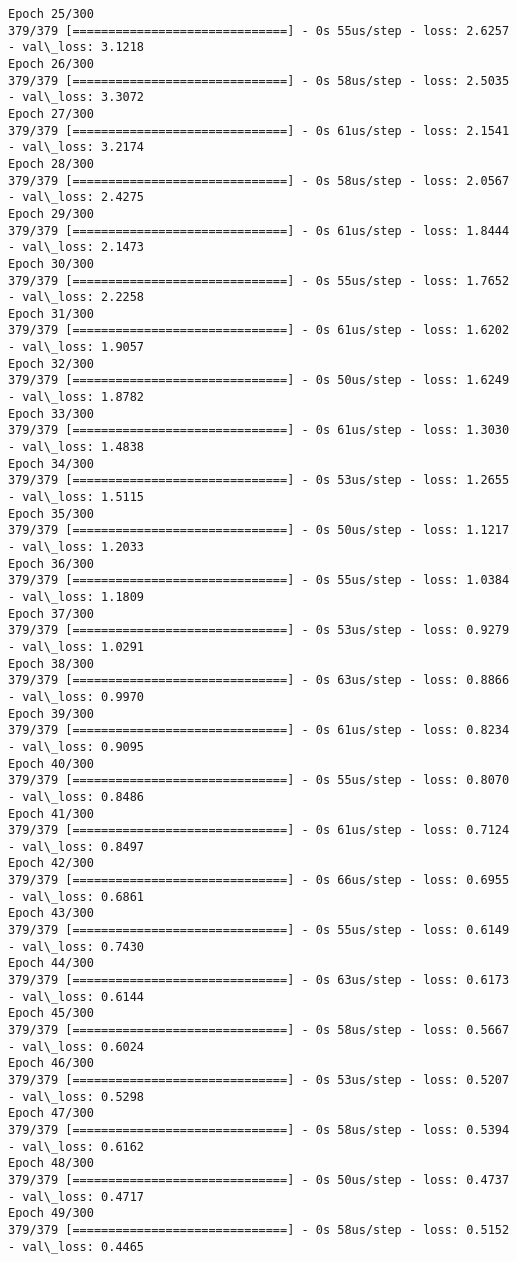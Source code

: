 \documentclass[11pt]{article}
\begin{document}
\begin{Verbatim}[commandchars=\\\{\}]
Epoch 25/300
379/379 [==============================] - 0s 55us/step - loss: 2.6257 - val\_loss: 3.1218
Epoch 26/300
379/379 [==============================] - 0s 58us/step - loss: 2.5035 - val\_loss: 3.3072
Epoch 27/300
379/379 [==============================] - 0s 61us/step - loss: 2.1541 - val\_loss: 3.2174
Epoch 28/300
379/379 [==============================] - 0s 58us/step - loss: 2.0567 - val\_loss: 2.4275
Epoch 29/300
379/379 [==============================] - 0s 61us/step - loss: 1.8444 - val\_loss: 2.1473
Epoch 30/300
379/379 [==============================] - 0s 55us/step - loss: 1.7652 - val\_loss: 2.2258
Epoch 31/300
379/379 [==============================] - 0s 61us/step - loss: 1.6202 - val\_loss: 1.9057
Epoch 32/300
379/379 [==============================] - 0s 50us/step - loss: 1.6249 - val\_loss: 1.8782
Epoch 33/300
379/379 [==============================] - 0s 61us/step - loss: 1.3030 - val\_loss: 1.4838
Epoch 34/300
379/379 [==============================] - 0s 53us/step - loss: 1.2655 - val\_loss: 1.5115
Epoch 35/300
379/379 [==============================] - 0s 50us/step - loss: 1.1217 - val\_loss: 1.2033
Epoch 36/300
379/379 [==============================] - 0s 55us/step - loss: 1.0384 - val\_loss: 1.1809
Epoch 37/300
379/379 [==============================] - 0s 53us/step - loss: 0.9279 - val\_loss: 1.0291
Epoch 38/300
379/379 [==============================] - 0s 63us/step - loss: 0.8866 - val\_loss: 0.9970
Epoch 39/300
379/379 [==============================] - 0s 61us/step - loss: 0.8234 - val\_loss: 0.9095
Epoch 40/300
379/379 [==============================] - 0s 55us/step - loss: 0.8070 - val\_loss: 0.8486
Epoch 41/300
379/379 [==============================] - 0s 61us/step - loss: 0.7124 - val\_loss: 0.8497
Epoch 42/300
379/379 [==============================] - 0s 66us/step - loss: 0.6955 - val\_loss: 0.6861
Epoch 43/300
379/379 [==============================] - 0s 55us/step - loss: 0.6149 - val\_loss: 0.7430
Epoch 44/300
379/379 [==============================] - 0s 63us/step - loss: 0.6173 - val\_loss: 0.6144
Epoch 45/300
379/379 [==============================] - 0s 58us/step - loss: 0.5667 - val\_loss: 0.6024
Epoch 46/300
379/379 [==============================] - 0s 53us/step - loss: 0.5207 - val\_loss: 0.5298
Epoch 47/300
379/379 [==============================] - 0s 58us/step - loss: 0.5394 - val\_loss: 0.6162
Epoch 48/300
379/379 [==============================] - 0s 50us/step - loss: 0.4737 - val\_loss: 0.4717
Epoch 49/300
379/379 [==============================] - 0s 58us/step - loss: 0.5152 - val\_loss: 0.4465

\end{Verbatim}
\end{document}
